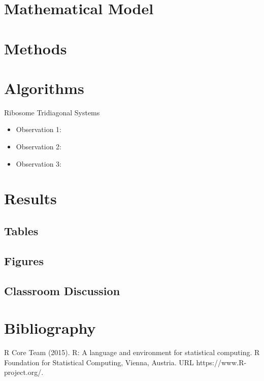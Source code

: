 \section{Mathematical Model}

\section{Methods}

\section{Algorithms}

\begin{algorithm}[H]
	\begin{algorithmic}[1]
	\end{algorithmic}
\caption{Ribosome Tridiagonal Systems}
\label{RibosomeTRIDS_1}
\end{algorithm}
\begin{itemize}
	\item Observation 1: \\
	\item Observation 2:  \\
	\item Observation 3:  \\
\end{itemize}	

\section{Results}

\subsection{Tables}

\subsection{Figures}

\subsection{Classroom Discussion}

\section{Bibliography}


\begin{thebibliography}{00}

R Core Team (2015). 
\newblock R: A language and environment for statistical computing. R Foundation for Statistical Computing, Vienna, Austria.
\newblock URL https://www.R-project.org/.

\end{thebibliography}


